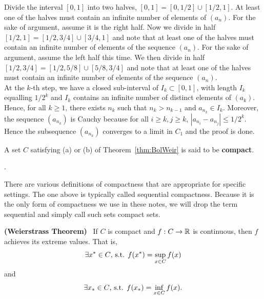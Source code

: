 Divide the interval $[0, 1]$ into two halves, $[0, 1] = [0, 1/2] \cup [1/2, 1]$. At least one of the halves must contain an infinite number of elements of $(a_n)$. For the sake of argument, assume it is the right half. Now we divide in half $[1/2, 1] = [1/2, 3/4] \cup [3/4, 1]$ and note that at least one of the halves must contain an infinite number of elements of the sequence $(a_n)$. For the sake of argument, assume the left half this time. We then divide in half $[1/2, 3/4]=[1/2, 5/8] \cup [5/8, 3/4]$  and note that at least one of the halves must contain an infinite number of elements of the sequence $(a_n)$.\\

At the $k$-th step, we have a closed sub-interval of $I_k \subset [0, 1]$, with length $I_k$ equalling $1/2^k$ and $I_k$ contains an infinite number of distinct elements of $(a_k)$. Hence, for all $k\ge 1$, there exists $n_k$ such that $n_k > n_{k-1}$ and $a_{n_k} \in I_k$. Moreover, the sequence $(a_{n_k})$ is Cauchy because for all $i\ge k, j \ge k$, $|a_{n_i}- a_{n_j}| \le 1/2^k$. Hence the subsequence $(a_{n_k})$ converges to a limit in $C_1$ and the proof is done.

\Qed


\begin{definition} A set $C$ satisfying (a) or (b) of Theorem~\ref{thm:BolWeir} is said to be \textbf{ compact}. 
\end{definition}.


\begin{rem}
There are various definitions of compactness that are appropriate for specific settings. The one above is typically called sequential compactness. Because it is the only form of compactness we use in these notes, we will drop the term sequential and simply call such sets compact sets. 
\end{rem}


\begin{thm} \textbf{(Weierstrass Theorem)}~ If $C$ is compact and $f: C \to \mathbb R$ is continuous, then $f$ achieves its extreme values. That is,
    \begin{equation*}
        \exists x^\ast \in C\textnormal{, s.t. }f(x^\ast)=\sup\limits_{x\in C}f(x)
    \end{equation*}
    and
    \begin{equation*}
        \exists x_* \in C\textnormal{, s.t. }f(x_*)=\inf\limits_{x\in C}f(x).
    \end{equation*}

\end{thm}

